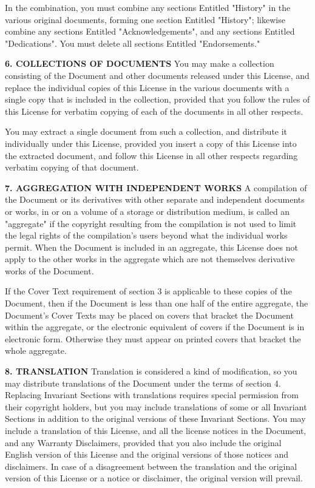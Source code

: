 In the combination, you must combine any sections Entitled "History" in the various original documents, forming one section Entitled "History"; likewise combine any sections Entitled "Acknowledgements", and any sections Entitled "Dedications". You must delete all sections Entitled "Endorsements."

\textbf{6. COLLECTIONS OF DOCUMENTS}
You may make a collection consisting of the Document and other documents released under this License, and replace the individual copies of this License in the various documents with a single copy that is included in the collection, provided that you follow the rules of this License for verbatim copying of each of the documents in all other respects.

You may extract a single document from such a collection, and distribute it individually under this License, provided you insert a copy of this License into the extracted document, and follow this License in all other respects regarding verbatim copying of that document. 

\textbf{7. AGGREGATION WITH INDEPENDENT WORKS}
A compilation of the Document or its derivatives with other separate and independent documents or works, in or on a volume of a storage or distribution medium, is called an "aggregate" if the copyright resulting from the compilation is not used to limit the legal rights of the compilation's users beyond what the individual works permit. When the Document is included in an aggregate, this License does not apply to the other works in the aggregate which are not themselves derivative works of the Document.

If the Cover Text requirement of section 3 is applicable to these copies of the Document, then if the Document is less than one half of the entire aggregate, the Document's Cover Texts may be placed on covers that bracket the Document within the aggregate, or the electronic equivalent of covers if the Document is in electronic form. Otherwise they must appear on printed covers that bracket the whole aggregate. 

\textbf{8. TRANSLATION}
Translation is considered a kind of modification, so you may distribute translations of the Document under the terms of section 4. Replacing Invariant Sections with translations requires special permission from their copyright holders, but you may include translations of some or all Invariant Sections in addition to the original versions of these Invariant Sections. You may include a translation of this License, and all the license notices in the Document, and any Warranty Disclaimers, provided that you also include the original English version of this License and the original versions of those notices and disclaimers. In case of a disagreement between the translation and the original version of this License or a notice or disclaimer, the original version will prevail.

